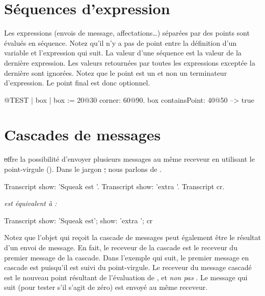 \documentclass[a4paper,10pt,twoside]{book}
\begin{document}
\section{S\'equences d'expression}
Les expressions (\ie envois de message, affectations\ldots) s\'epar\'ees par des points sont \'evalu\'es en s\'equence.
Notez qu'il n'y a pas de point entre la d\'efinition d'un variable et l'expression qui suit.
La valeur d'une s\'equence est la valeur de la derni\`ere
expression. Les valeurs retourn\'ees par toutes les expressions
except\'ee la derni\`ere sont ignor\'ees. Notez que le point est un 
et non un terminateur d'expression. Le point final est donc optionnel.

\begin{code}{@TEST}
| box |
box := 20@30 corner: 60@90.
box containsPoint: 40@50 --> true
\end{code}

\section{Cascades de messages}
\st offre la possibilit\'e d'envoyer plusieurs messages au m\^eme
receveur en utilisant le point-virgule (\ct{;}). Dans le jargon \st,
nous parlons de .


\begin{minipage}{0.3\textwidth}
\begin{code}{}
Transcript show: 'Squeak est '.
Transcript show: 'extra '.
Transcript cr.
\end{code}
\end{minipage}
\emph{est \'equivalent \`a :}
\begin{minipage}{0.3\textwidth}
\begin{code}{}
Transcript        
   show: 'Squeak est';
   show: 'extra ';
   cr
\end{code}
\end{minipage}

Notez que l'objet qui re\c{c}oit la cascade de messages peut \'egalement \^etre le r\'esultat d'un envoi de message.
En fait, le receveur de la cascade est le receveur du premier message
de la cascade. Dans l'exemple qui suit, le premier message en cascade
est  puisqu'il est suivi du point-virgule. Le receveur
du message cascad\'e  est le nouveau point r\'esultant
de l'\'evaluation de , et \emph{non pas} . Le
message qui suit  (pour tester s'il s'agit de z\'ero) est
envoy\'e au m\^eme receveur. 
\end{document}
